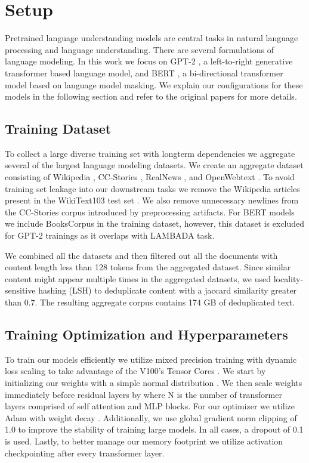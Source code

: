 \documentclass{article}
\begin{document}
 \section{Setup} 
\label{language_modeling}
Pretrained language understanding models are central tasks in natural language processing and language understanding. There are several formulations of language modeling. In this work we focus on GPT-2 \cite{Radford2019GPT2}, a left-to-right generative transformer based language model, and BERT \cite{devlin2018bert}, a bi-directional transformer model based on language model masking. We explain our configurations for these models in the following section and refer to the original papers for more details.

\subsection{Training Dataset}

To collect a large diverse training set with longterm dependencies we aggregate several of the largest language modeling datasets. We create an aggregate dataset consisting of Wikipedia \citep{devlin2018bert}, CC-Stories \citep{ccstories}, RealNews \citep{grover}, and OpenWebtext \cite{Radford2019GPT2}. To avoid training set leakage into our downstream tasks we remove the Wikipedia articles present in the WikiText103 test set \citep{wikitext}. We  also remove unnecessary newlines from the CC-Stories corpus introduced by preprocessing artifacts. For BERT models we include BooksCorpus \cite{BooksCorpus} in the training dataset, however, this dataset is excluded for GPT-2 trainings as it overlaps with LAMBADA task.

We combined all the datasets and then filtered out all the documents with content length less than 128 tokens from the aggregated dataset. Since similar content might appear multiple times in the aggregated datasets, we used locality-sensitive hashing (LSH) to deduplicate content with a jaccard similarity greater than 0.7. The resulting aggregate corpus contains 174 GB of deduplicated text.

\subsection{Training Optimization and Hyperparameters}
To train our models efficiently we utilize mixed precision training with dynamic loss scaling to take advantage of the V100's Tensor Cores \citep{MPTraining, AutoLossScale}. We start by initializing our weights  with a simple normal distribution . We then scale weights immediately before residual layers by  where N is the number of transformer layers comprised of self attention and MLP blocks. For our optimizer we utilize  Adam  \citep{Adam} with weight decay \citep{loshchilov2018decoupled} . 
Additionally, we use global gradient norm clipping of 1.0 to improve the stability of training large models. In all cases, a dropout of 0.1 is used.
 Lastly, to better manage our memory footprint we utilize activation checkpointing \citep{activation_checkpointing} after every transformer layer.
 
\end{document}
